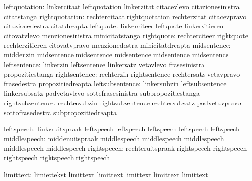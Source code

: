             leftquotation: linkercitaat              leftquotation
                           linkerzitat               citacevlevo
                           citazionesinistra         citatstanga
           rightquotation: rechtercitaat             rightquotation
                           rechterzitat              citacevpravo
                           citazionedestra           citatdreapta
                leftquote: linkerciteer              leftquote
                           linkerzitieren            citovatvlevo
                           menzionesinistra          minicitatstanga
               rightquote: rechterciteer             rightquote
                           rechterzitieren           citovatvpravo
                           menzionedestra            minicitatdreapta
midsentence: middenzin                 midsentence
             midsentence               midsentence
             midsentence               midsentence
             leftsentence: linkerzin                 leftsentence
                           linkersatz                vetavlevo
                           frasesinistra             propozitiestanga
            rightsentence: rechterzin                rightsentence
                           rechtersatz               vetavpravo
                           frasedestra               propozitiedreapta
          leftsubsentence: linkersubzin              leftsubsentence
                           linkersubsatz             podvetavlevo
                           sottofrasesinistra        subpropozitiestanga
         rightsubsentence: rechtersubzin             rightsubsentence
                           rechtersubsatz            podvetavpravo
                           sottofrasedestra          subpropozitiedreapta

               leftspeech: linkeruitspraak           leftspeech
                           leftspeech                leftspeech
                           leftspeech                leftspeech %
             middlespeech: middenuitspraak           middlespeech
                           middlespeech              middlespeech
                           middlespeech              middlespeech %
              rightspeech: rechteruitspraak          rightspeech
                           rightspeech               rightspeech
                           rightspeech               rightspeech %

                limittext: limiettekst               limittext
                           limittext                 limittext
                           limittext                 limittext

